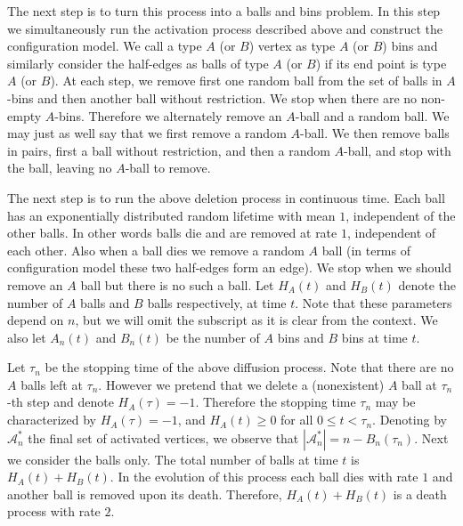 \documentclass[11pt]{article}
\newcommand{\cA}{\mathcal{A}}
\begin{document}
The next step is to turn this process into a balls and bins problem. In this step we simultaneously run the activation process described above and construct the configuration model. We call a type $A$ (or $B$) vertex as type $A$ (or $B$) bins and similarly consider the half-edges as balls of type $A$ (or $B$) if its end point is type $A$ (or $B$). At each step, we remove first one random ball from the set of balls in $A$-bins and then another ball without restriction. We stop when there are no non-empty $A$-bins. Therefore we alternately remove an $A$-ball and a random ball. We may just as well say that we first remove a random $A$-ball. We then remove balls in pairs, first a ball without restriction, and then a random $A$-ball, and stop with the ball, leaving no $A$-ball to remove. %

The next step is to run the above deletion process in continuous time. Each ball has an exponentially distributed random lifetime with mean $1$, independent of the other balls. In other words balls die and are removed at rate $1$, independent of each other. Also when a ball dies we remove a random $A$ ball (in terms of configuration model these two half-edges form an edge). We stop when we should remove an $A$ ball but there is no such a ball. Let $H_A(t)$ and $H_B(t)$ denote the number of $A$ balls and $B$ balls respectively, at time $t$. Note that these parameters depend on $n$, but we will omit the subscript as it is clear from the context. We also let $A_n(t)$ and $B_n(t)$ be the number of $A$ bins and $B$ bins at time $t$. 

Let $\tau_n$ be the stopping time of the above diffusion process. Note that there are no $A$ balls left at $\tau_n$. However we pretend that we delete a (nonexistent) $A$ ball at $\tau_n$-th step and denote $H_A(\tau) = -1$. Therefore the stopping time $\tau_n$ may be characterized by $H_A(\tau) = -1$, and $H_A(t) \geq 0$ for all $0\leq t < \tau_n$. Denoting by $\cA_n^*$ the final set of activated vertices, we observe that $|\cA^*_n|= n-B_n(\tau_n).$ 
Next we consider the balls only. The total number of balls at time $t$ is $H_A(t)+H_B(t)$. In the evolution of this process each ball dies with rate $1$ and another ball is removed upon its death. Therefore, $H_A(t)+H_B(t)$ is a death process with rate $2$.  
\end{document}
